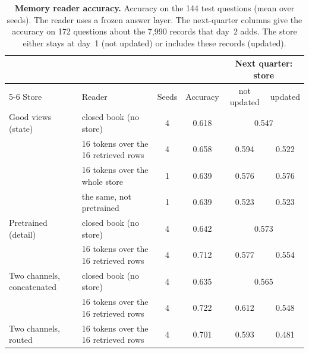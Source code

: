 \documentclass[11pt]{article}
\begin{document}
\begin{table}[h]
\centering
\small
\caption{\textbf{Memory reader accuracy.} Accuracy on the 144 test questions (mean over seeds). The reader uses a frozen answer layer. The next-quarter columns give the accuracy on 172 questions about the 7{,}990 records that day~2 adds. The store either stays at day~1 (not updated) or includes these records (updated).}
\label{tab:memory}
\begin{tabular}{llcccc}
\toprule
& & & & \multicolumn{2}{c}{Next quarter: store} \\
\cmidrule(lr){5-6}
Store & Reader & Seeds & Accuracy & not updated & updated \\
\midrule
Good views (state) & closed book (no store) & 4 & 0.618 & \multicolumn{2}{c}{0.547} \\
 & 16 tokens over the 16 retrieved rows & 4 & 0.658 & 0.594 & 0.522 \\
 & 16 tokens over the whole store & 1 & 0.639 & 0.576 & 0.576 \\
 & the same, not pretrained & 1 & 0.639 & 0.523 & 0.523 \\
\addlinespace[2pt]
Pretrained (detail) & closed book (no store) & 4 & 0.642 & \multicolumn{2}{c}{0.573} \\
 & 16 tokens over the 16 retrieved rows & 4 & 0.712 & 0.577 & 0.554 \\
\addlinespace[2pt]
Two channels, concatenated & closed book (no store) & 4 & 0.635 & \multicolumn{2}{c}{0.565} \\
 & 16 tokens over the 16 retrieved rows & 4 & 0.722 & 0.612 & 0.548 \\
\addlinespace[2pt]
Two channels, routed & 16 tokens over the 16 retrieved rows & 4 & 0.701 & 0.593 & 0.481 \\
\bottomrule
\end{tabular}
\end{table}
\end{document}
